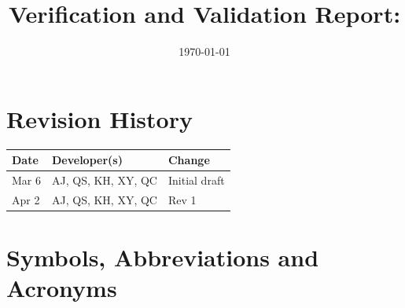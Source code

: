 \documentclass[12pt, titlepage]{article}
\begin{document}
\title{Verification and Validation Report: \progname} 
\author{\authname}
\date{\today}

\maketitle


\section{Revision History}

\begin{tabularx}{\textwidth}{llX}
  \toprule {\bf Date} & {\bf Developer(s)} & {\bf Change} \\
  \midrule
  Mar 6 & AJ, QS, KH, XY, QC & Initial draft \\
  Apr 2 & AJ, QS, KH, XY, QC & Rev 1 \\
  \bottomrule
\end{tabularx}

\newpage

\section{Symbols, Abbreviations and Acronyms}
\end{document}
